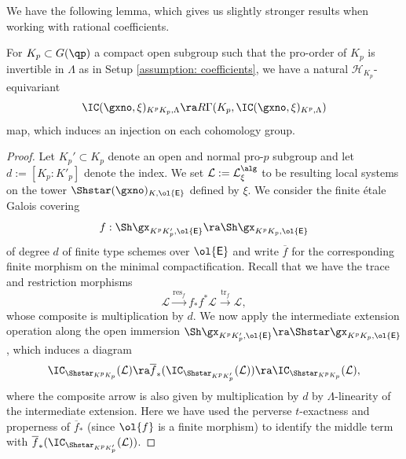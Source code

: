 \documentclass[letterpaper,11pt]{amsart}
\begin{document}
 We have the following lemma, which gives us slightly stronger results when working with rational coefficients. 

\begin{lemma}{\label{lemma: descentlemma}}
For $K_{p} \subset G(\qp)$ a compact open subgroup such that the pro-order of $K_{p}$ is invertible in $\Lambda$ as in Setup \ref{assumption: coefficients}, we have a natural $\mathcal{H}_{K_{p}}$-equivariant
\[ \IC(\gxno,\xi)_{K^{p}K_{p},\Lambda} \ra R\Gamma(K_{p},\IC(\gxno,\xi)_{K^{p},\Lambda}) \]
map, which induces an injection on each cohomology group. 
\end{lemma}
\begin{proof}
Let $K_{p}' \subset K_{p}$ denote an open and normal pro-$p$ subgroup and let $d := [K_{p}:K'_p]$ denote the index. We set $\mathcal{L} := \mathcal{L}_{\xi}^{\alg}$ to be resulting local systems on the tower $\Shstar(\gxno)_{K,\ol{\mathsf{E}}}$ defined by $\xi$. We consider the finite \'etale Galois covering 
\[ f: \Sh\gx_{K^{p}K_{p}',\ol{\mathsf{E}}} \ra \Sh\gx_{K^{p}K_{p},\ol{\mathsf{E}}} \]
of degree $d$ of finite type schemes over $\ol{\mathsf{E}}$ and write $\overline{f}$ for the corresponding finite morphism on the minimal compactification. Recall that we have the trace and restriction morphisms 
\[ \mathcal{L} \xrightarrow{\mathrm{res}_{f}} f_{*}f^{*}\mathcal{L} \xrightarrow{\mathrm{tr}_{f}} \mathcal{L}, \]
whose composite is multiplication by $d$. We now apply the intermediate extension operation along the open immersion $\Sh\gx_{K^{p}K_{p}',\ol{\mathsf{E}}} \ra \Shstar\gx_{K^{p}K_{p},\ol{\mathsf{E}}}$, which induces a diagram
\begin{equation}{\label{eqn: methodelatraceforIntCoh}}
\IC_{\Shstar_{K^{p}K_{p}}}(\mathcal{L}) \ra \overline{f}_{*}(\IC_{\Shstar_{K^{p}K_p'}}(\mathcal{L})) \ra \IC_{\Shstar_{K^{p}K_{p}}}(\mathcal{L}),  
\end{equation}
where the composite arrow is also given by multiplication by $d$ by $\Lambda$-linearity of the intermediate extension. Here we have used the perverse $t$-exactness and properness of $\overline{f}_{*}$ (since $\ol{f}$ is a finite morphism) to identify the middle term with $\overline{f}_{*}(\IC_{\Shstar_{K^{p}K_p'}}(\mathcal{L}))$. 


\end{proof}
\end{document}
